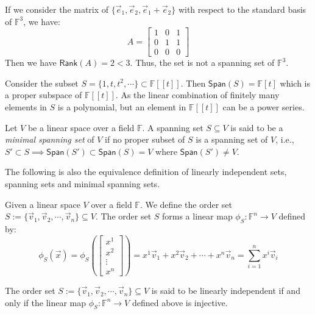 \documentclass[
	11pt, %
	fleqn, %
	a4paper, %
]{LegrandOrangeBook}
\renewcommand{\span}[1]{\mathsf{Span}(#1)} %
\newcommand{\F}{\mathbb{F}} %
\newcommand{\rank}[1]{\mathsf{Rank}(#1)} %
\begin{document}
\begin{remark}
    If we consider the matrix of $\{\vec{e}_1, \vec{e}_2, \vec{e}_1 + \vec{e}_2\}$ with respect to the standard basis of $\F^3$, we have:
    \[
        A = \begin{bmatrix}
            1 & 0 & 1 \\
            0 & 1 & 1 \\
            0 & 0 & 0
        \end{bmatrix}
    \]
    Then we have $\rank{A} = 2 < 3$. Thus, the set is not a spanning set of $\F^3$.
\end{remark}

\begin{example}
    Consider the subset $S = \{ 1, t, t^2, \cdots \} \subset \F[[t]]$. Then $\span{S} = \F[t]$ which is a proper subspace of $\F[[t]]$. As the linear combination of finitely many elements in $S$ is a polynomial, but an element in $\F[[t]]$ can be a power series.
\end{example}

\begin{definition}
    Let $V$ be a linear space over a field $\F$. A spanning set $S \subseteq V$ is said to be a \emph{minimal spanning set} of $V$ if no proper subset of $S$ is a spanning set of $V$, i.e., $S' \subset S \implies \span{S'} \subset \span{S} = V$ where $\span{S'} \neq V$.
\end{definition}

The following is also the equivalence definition of linearly independent sets, spanning sets and minimal spanning sets.

Given a linear space $V$ over a field $\F$. We define the order set $S := \{\vec{v}_1, \vec{v}_2, \cdots, \vec{v}_n\} \subseteq V$. The order set $S$ forms a linear map $\phi_S: \F^n \to V$ defined by:
\[
    \phi_S(\vec{x}) = \phi_S\left(\begin{bmatrix}
        x^1 \\
        x^2 \\
        \vdots \\
        x^n
    \end{bmatrix}\right) = x^1 \vec{v}_1 + x^2 \vec{v}_2 + \cdots + x^n \vec{v}_n = \sum_{i=1}^{n} x^i \vec{v}_i
\]

\begin{proposition}
    The order set $S := \{\vec{v}_1, \vec{v}_2, \cdots, \vec{v}_n\} \subseteq V$ is said to be linearly independent if and only if the linear map $\phi_S: \F^n \to V$ defined above is injective.
\end{proposition}
\end{document}
